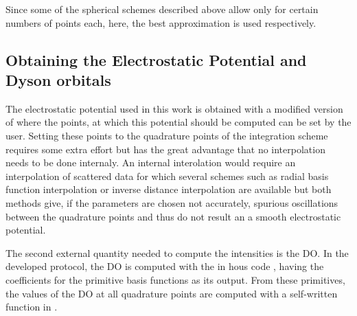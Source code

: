 Since some of the spherical schemes described above allow only for certain numbers of points each, here, the best approximation is used respectively.

\subsection{Obtaining the Electrostatic Potential and Dyson orbitals}
The electrostatic potential used in this work is obtained with a modified version of  \cite{nwchem} where the points, at which this potential should be computed can be set by the user.
Setting these points to the quadrature points of the integration scheme requires some extra effort but has the great advantage that no interpolation needs to be done internaly.
An internal interolation would require an interpolation of scattered data for which several schemes such as radial basis function interpolation or inverse distance interpolation are available but both methods give, if the parameters are chosen not accurately, spurious oscillations between the quadrature points and thus do not result an a smooth electrostatic potential.

The second external quantity needed to compute the intensities is the DO.
In the developed protocol, the DO is computed with the in hous code  \cite{MAgg}, having the coefficients for the primitive basis functions as its output.
From these primitives, the values of the DO at all quadrature points are computed with a self-written function in .
